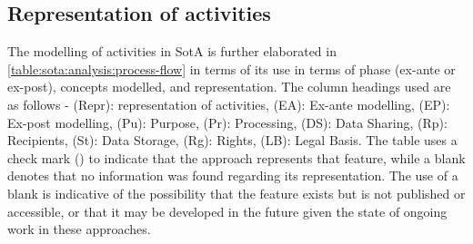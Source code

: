 \subsection{Representation of activities}\label{sota:analysis:process-flows}
The modelling of activities in SotA is further elaborated in \autoref{table:sota:analysis:process-flow} in terms of its use in terms of phase (ex-ante or ex-post), concepts modelled, and representation. The column headings used are as follows - (Repr): representation of activities, (EA): Ex-ante modelling, (EP): Ex-post modelling, (Pu): Purpose, (Pr): Processing, (DS): Data Sharing, (Rp): Recipients, (St): Data Storage, (Rg): Rights, (LB): Legal Basis.
The table uses a check mark (\cmark) to indicate that the approach represents that feature, while a blank denotes that no information was found regarding its representation. The use of a blank is indicative of the possibility that the feature exists but is not published or accessible, or that it may be developed in the future given the state of ongoing work in these approaches.
